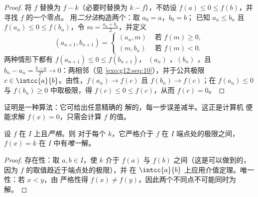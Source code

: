 \begin{proof}
将 $f$ 替换为 $f - k$（必要时替换为 $k - f$），不妨设
$f(a) \leq 0 \leq f(b)$，并寻找 $f$ 的一个零点。
用\emph{二分法}构造两个：取 $a_0 = a$，$b_0 = b$；
已知 $a_n \leq b_n$ 且 $f(a_n) \leq 0 \leq f(b_n)$，令
$m = \frac{a_n + b_n}{2}$，并定义
\[
(a_{n+1}, b_{n+1}) =
\begin{cases}
(a_n, m) & \text{ 若 } f(m) \geq 0,\\
(m, b_n) & \text{ 若 } f(m) < 0.
\end{cases}
\]
两种情形下都有 $f(a_{n+1}) \leq 0 \leq f(b_{n+1})$， $(a_n)$
，$(b_n)$ ，且
$b_n - a_n = \frac{b-a}{2^n} \to 0$：两相邻（见
\cref{exo:g12:seq:10}），并于公共极限
$c \in \intcc{a}{b}$。由性，$f(a_n) \to f(c)$ 且
$f(b_n) \to f(c)$；在 $f(a_n) \leq 0$ 与
$f(b_n) \geq 0$ 中取极限，得 $f(c) \leq 0 \leq f(c)$，从而 $f(c) = 0$。
\end{proof}

\begin{remark}
证明是一种算法：它可给出任意精确的
解的，每一步误差减半。这正是计算机
便能求解 $f(x) = 0$，只需会计算 $f$ 的值。
\end{remark}

\begin{theorem}[双射定理]\label{thm:g12:limcont:bijection}
设 $f$ 在 $I$ 上且\emph{严格}。则
对于每个 $k$，它严格介于 $f$ 在 $I$ 端点处的极限之间，
 $f(x) = k$ 在 $I$ 中有\emph{唯一}解。
\end{theorem}

\begin{proof}
存在性：取 $a, b \in I$，使 $k$ 介于 $f(a)$ 与 $f(b)$ 之间（这是可以做到的，
因为 $f$ 的取值趋近于端点处的极限），并
在 $\intcc{a}{b}$ 上应用介值定理。唯一性：若 $x < y$，由
严格性得 $f(x) \neq f(y)$，因此两个不同点不可能同时为
解。
\end{proof}

